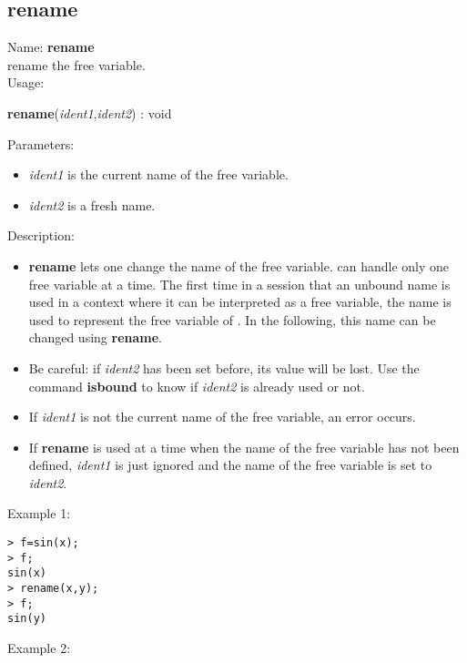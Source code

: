 \subsection{rename}
\label{labrename}
\noindent Name: \textbf{rename}\\
rename the free variable.\\
\noindent Usage: 
\begin{center}
\textbf{rename}(\emph{ident1},\emph{ident2}) : \textsf{void}
\\ 
\end{center}
Parameters: 
\begin{itemize}
\item \emph{ident1} is the current name of the free variable.
\item \emph{ident2} is a fresh name.
\end{itemize}
\noindent Description: \begin{itemize}

\item \textbf{rename} lets one change the name of the free variable. \sollya can handle only
   one free variable at a time. The first time in a session that an unbound name 
   is used in a context where it can be interpreted as a free variable, the name
   is used to represent the free variable of \sollya. In the following, this name
   can be changed using \textbf{rename}.

\item Be careful: if \emph{ident2} has been set before, its value will be lost. Use the 
   command \textbf{isbound} to know if \emph{ident2} is already used or not.

\item If \emph{ident1} is not the current name of the free variable, an error occurs.

\item If \textbf{rename} is used at a time when the name of the free variable has not been 
   defined, \emph{ident1} is just ignored and the name of the free variable is 
   set to \emph{ident2}.
\end{itemize}
\noindent Example 1: 
\begin{center}\begin{minipage}{15cm}\begin{Verbatim}[frame=single]
> f=sin(x);
> f;
sin(x)
> rename(x,y);
> f;
sin(y)
\end{Verbatim}
\end{minipage}\end{center}
\noindent Example 2: 
